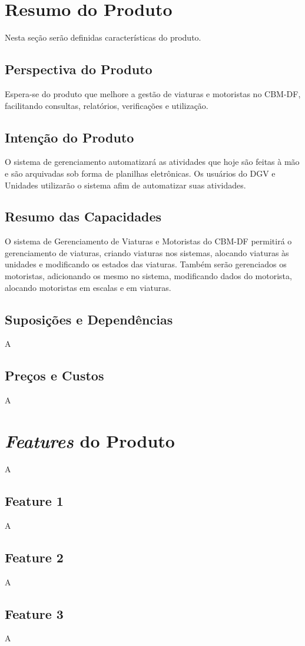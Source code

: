 \begin{apendicesenv}
	\section{Resumo do Produto}
Nesta seção serão definidas características do produto.
		\subsection{Perspectiva do Produto}
Espera-se do produto que melhore a gestão de viaturas e motoristas no CBM-DF, facilitando consultas, relatórios, verificações e utilização.
		\subsection{Intenção do Produto}
O sistema de gerenciamento automatizará as atividades que hoje são feitas à mão e são arquivadas sob forma de planilhas eletrônicas. Os usuários do DGV e Unidades utilizarão o sistema afim de automatizar suas atividades.
		\subsection{Resumo das Capacidades}
O sistema de Gerenciamento de Viaturas e Motoristas do CBM-DF permitirá o gerenciamento de viaturas, criando viaturas nos sistemas, alocando viaturas às unidades e modificando os estados das viaturas. Também serão gerenciados os motoristas, adicionando os mesmo no sistema, modificando dados do motorista, alocando motoristas em escalas e em viaturas.
		\subsection{Suposições e Dependências}
A
		\subsection{Preços e Custos}
A
	\section{\textit{Features} do Produto}
A
		\subsection{Feature 1}
A
		\subsection{Feature 2}
A
		\subsection{Feature 3}
A

\end{apendicesenv}
